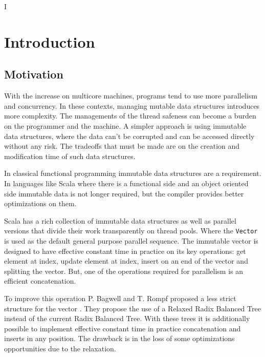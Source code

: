 I%
\lhead{} 

\chapter{Introduction} %
\label{Introduction} %



\section{Motivation}
With the increase on multicore machines, programs tend to use more parallelism and concurrency. In these contexts, managing mutable data structures introduces more complexity. The managements of the thread safeness can become a burden on the programmer and the machine. A simpler approach is using immutable data structures, where the data can't be corrupted and can be accessed directly without any risk. The tradeoffs that must be made are on the creation and modification time of such data structures.

In classical functional programming immutable data structures are a requirement. In languages like Scala where there is a functional side and an object oriented side immutable data is not longer required, but the compiler provides better optimizations on them.

Scala has a rich collection of immutable data structures as well as parallel versions that divide their work transparently on thread pools. Where the \texttt{Vector} is used as the default general purpose parallel sequence. The immutable vector is designed to have effective constant time in practice on its key operations: get element at index, update element at index, insert on an end of the vector and splitting the vector. But, one of the operations required for parallelism is an efficient concatenation.

To improve this operation P. Bagwell and T. Rompf proposed a less strict structure for the vector \cite{RRBTrees}. They propose the use of a Relaxed Radix Balanced Tree instead of the current Radix Balanced Tree. With these trees it is additionally possible to implement effective constant time in practice concatenation and inserts in any position. The drawback is in the loss of some optimizations opportunities due to the relaxation.


